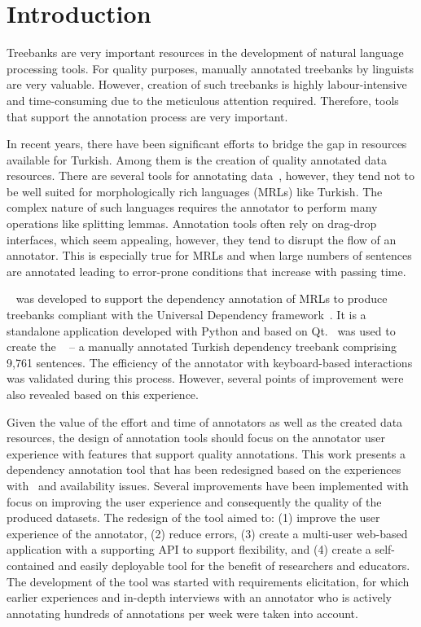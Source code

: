 \section{Introduction}
\label{sec:introduction}

Treebanks are very important resources in the development of natural language processing tools.
For quality purposes, manually annotated treebanks by linguists are very valuable. 
However, creation of such treebanks is highly labour-intensive and time-consuming due to the meticulous attention required.
Therefore, tools that support the annotation process are very important. 

In recent years, there have been significant efforts to bridge the gap in resources available for Turkish. 
Among them is the creation of quality annotated data resources. 
There are several tools for annotating data~\cite{brat,dgannotator}, however, they tend not to be well suited for morphologically rich languages (MRLs) like Turkish.
The complex nature of such languages requires the annotator to perform many operations like splitting lemmas.
Annotation tools often rely on drag-drop interfaces, which seem appealing, however, they tend to disrupt the flow of an annotator. 
This is especially true for MRLs and when large numbers of sentences are annotated leading to error-prone conditions that increase with passing time. 

\boatvone~\cite{trk2020resources} was developed to support the dependency annotation of MRLs to produce treebanks compliant with the Universal Dependency framework~\cite{UD}. 
It is a standalone application developed with Python and based on Qt.
\boatvone\ was used to create the \bountreebank~\cite{turk-etal-2019-turkish,trk2020resources,UD-Boun-Treebank} -- a manually annotated Turkish dependency treebank comprising 9,761 sentences.
The efficiency of the annotator with keyboard-based interactions was validated during this process. 
However, several points of improvement were also revealed based on this experience.

Given the value of the effort and time of annotators as well as the created data resources, the design of annotation tools should focus on the annotator user experience with features that support quality annotations. 
This work presents a dependency annotation tool that has been redesigned based on the experiences with \boatvone\ and availability issues.
Several improvements have been implemented with focus on improving the user experience and consequently the quality of the produced datasets.
The redesign of the tool aimed to: (1) improve the user experience of the annotator, (2) reduce errors, (3) create a multi-user web-based application with a supporting API to support flexibility, and (4) create a self-contained and easily deployable tool for the benefit of researchers and educators. 
The development of the tool was started with requirements elicitation, for which earlier experiences and in-depth interviews with an annotator who is actively annotating hundreds of annotations per week were taken into account.

